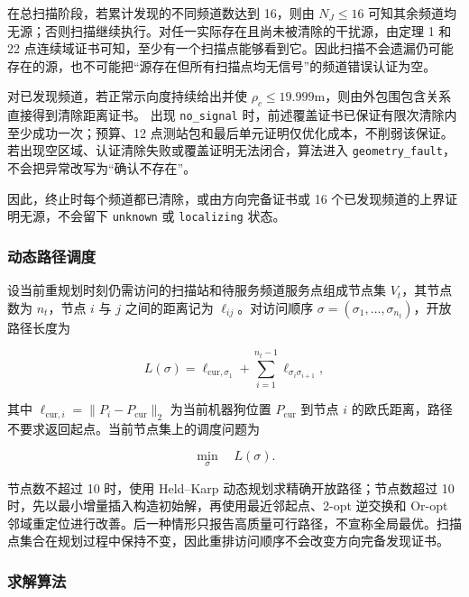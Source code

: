 在总扫描阶段，若累计发现的不同频道数达到 16，则由 $N_J\le16$ 可知其余频道均无源；否则扫描继续执行。对任一实际存在且尚未被清除的干扰源，由定理 1 和 22 点连续域证书可知，至少有一个扫描点能够看到它。因此扫描不会遗漏仍可能存在的源，也不可能把“源存在但所有扫描点均无信号”的频道错误认证为空。

对已发现频道，若正常示向度持续给出并使 $\rho_c\le19.999\mathrm{m}$，则由外包围包含关系直接得到清除距离证书。
出现 \texttt{no\_signal} 时，前述覆盖证书已保证有限次清除内至少成功一次；预算、12 点测站包和最后单元证明仅优化成本，不削弱该保证。
若出现空区域、认证清除失败或覆盖证明无法闭合，算法进入 \texttt{geometry\_fault}，不会把异常改写为“确认不存在”。

因此，终止时每个频道都已清除，或由方向完备证书或 16 个已发现频道的上界证明无源，不会留下 \texttt{unknown} 或 \texttt{localizing} 状态。

\subsubsection{动态路径调度}

设当前重规划时刻仍需访问的扫描站和待服务频道服务点组成节点集 $V_t$，其节点数为 $n_t$，节点 $i$ 与 $j$ 之间的距离记为 $\ell_{ij}$。对访问顺序 $\sigma=(\sigma_1,\ldots,\sigma_{n_t})$，开放路径长度为

\begin{equation}
L(\sigma)=
\ell_{\mathrm{cur},\sigma_1}
+
\sum_{i=1}^{n_t-1}
\ell_{\sigma_i\sigma_{i+1}},
\label{eq:q4_open_path}
\end{equation}

其中 $\ell_{\mathrm{cur},i}=\lVert P_i-P_{\mathrm{cur}}\rVert_2$ 为当前机器狗位置 $P_{\mathrm{cur}}$ 到节点 $i$ 的欧氏距离，路径不要求返回起点。当前节点集上的调度问题为

\begin{equation}
\min_{\sigma}\quad L(\sigma).
\label{eq:q4_route_problem}
\end{equation}

节点数不超过 10 时，使用 Held--Karp 动态规划求精确开放路径；节点数超过 10 时，先以最小增量插入构造初始解，再使用最近邻起点、2-opt 逆交换和 Or-opt 邻域重定位进行改善。后一种情形只报告高质量可行路径，不宣称全局最优。扫描点集合在规划过程中保持不变，因此重排访问顺序不会改变方向完备发现证书。

\subsubsection{求解算法}


